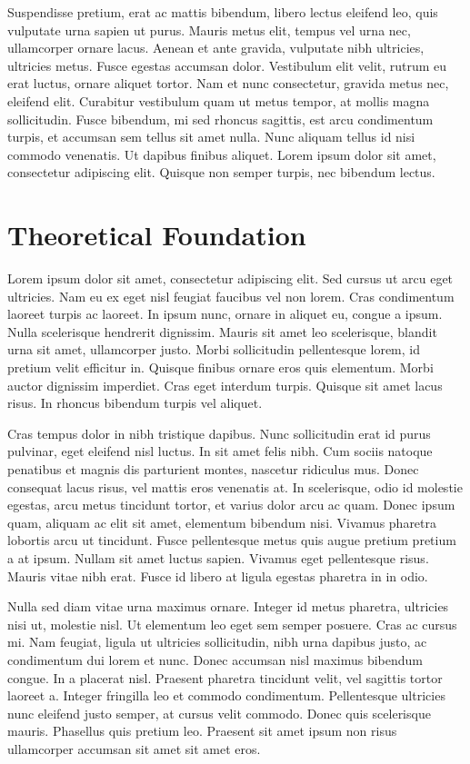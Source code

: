 \documentclass[a4paper,11pt]{kth-mag}
\begin{document}
Suspendisse pretium, erat ac mattis bibendum, libero lectus eleifend leo, quis vulputate urna sapien ut purus. Mauris metus elit, tempus vel urna nec, ullamcorper ornare lacus. Aenean et ante gravida, vulputate nibh ultricies, ultricies metus. Fusce egestas accumsan dolor. Vestibulum elit velit, rutrum eu erat luctus, ornare aliquet tortor. Nam et nunc consectetur, gravida metus nec, eleifend elit. Curabitur vestibulum quam ut metus tempor, at mollis magna sollicitudin. Fusce bibendum, mi sed rhoncus sagittis, est arcu condimentum turpis, et accumsan sem tellus sit amet nulla. Nunc aliquam tellus id nisi commodo venenatis. Ut dapibus finibus aliquet. Lorem ipsum dolor sit amet, consectetur adipiscing elit. Quisque non semper turpis, nec bibendum lectus.

\chapter{Theoretical Foundation}

Lorem ipsum dolor sit amet, consectetur adipiscing elit. Sed cursus ut arcu eget ultricies. Nam eu ex eget nisl feugiat faucibus vel non lorem. Cras condimentum laoreet turpis ac laoreet. In ipsum nunc, ornare in aliquet eu, congue a ipsum. Nulla scelerisque hendrerit dignissim. Mauris sit amet leo scelerisque, blandit urna sit amet, ullamcorper justo. Morbi sollicitudin pellentesque lorem, id pretium velit efficitur in. Quisque finibus ornare eros quis elementum. Morbi auctor dignissim imperdiet. Cras eget interdum turpis. Quisque sit amet lacus risus. In rhoncus bibendum turpis vel aliquet.

Cras tempus dolor in nibh tristique dapibus. Nunc sollicitudin erat id purus pulvinar, eget eleifend nisl luctus. In sit amet felis nibh. Cum sociis natoque penatibus et magnis dis parturient montes, nascetur ridiculus mus. Donec consequat lacus risus, vel mattis eros venenatis at. In scelerisque, odio id molestie egestas, arcu metus tincidunt tortor, et varius dolor arcu ac quam. Donec ipsum quam, aliquam ac elit sit amet, elementum bibendum nisi. Vivamus pharetra lobortis arcu ut tincidunt. Fusce pellentesque metus quis augue pretium pretium a at ipsum. Nullam sit amet luctus sapien. Vivamus eget pellentesque risus. Mauris vitae nibh erat. Fusce id libero at ligula egestas pharetra in in odio.

Nulla sed diam vitae urna maximus ornare. Integer id metus pharetra, ultricies nisi ut, molestie nisl. Ut elementum leo eget sem semper posuere. Cras ac cursus mi. Nam feugiat, ligula ut ultricies sollicitudin, nibh urna dapibus justo, ac condimentum dui lorem et nunc. Donec accumsan nisl maximus bibendum congue. In a placerat nisl. Praesent pharetra tincidunt velit, vel sagittis tortor laoreet a. Integer fringilla leo et commodo condimentum. Pellentesque ultricies nunc eleifend justo semper, at cursus velit commodo. Donec quis scelerisque mauris. Phasellus quis pretium leo. Praesent sit amet ipsum non risus ullamcorper accumsan sit amet sit amet eros.
\end{document}
